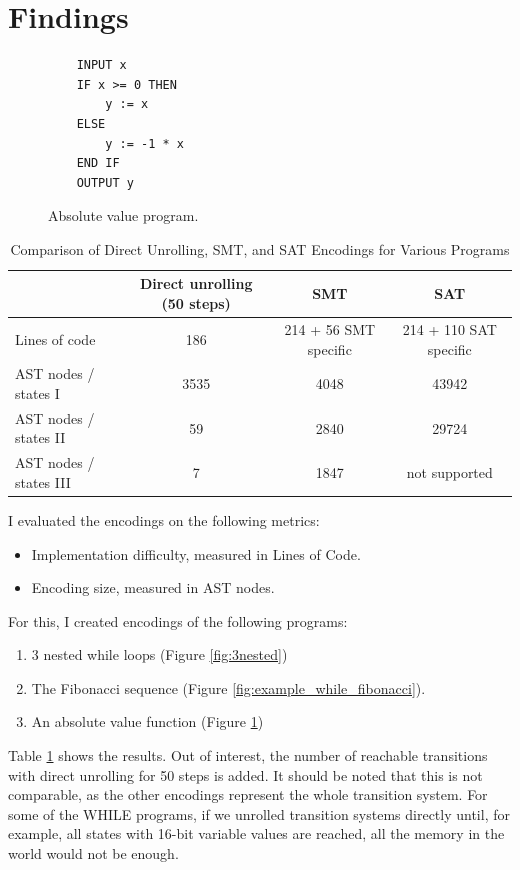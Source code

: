 \documentclass[sigconf,natbib=false]{acmart}
\begin{document}
\section{Findings}
\begin{figure}
    \centering
    \begin{verbatim}
    INPUT x
    IF x >= 0 THEN
        y := x
    ELSE
        y := -1 * x
    END IF
    OUTPUT y
    \end{verbatim}
    \caption{Absolute value program.}
    \label{fig:abs_value}
\end{figure}
\begin{table}
    \centering
    \caption{Comparison of Direct Unrolling, SMT, and SAT Encodings for Various Programs}
    \label{table}
    \begin{tabular}{|l|c|c|c|}
        \hline
        & Direct unrolling (50 steps) & SMT & SAT \\
        \hline


        Lines of code & 186 & 214 + 56 SMT specific & 214 + 110 SAT specific \\
        AST nodes / states I & 3535 & 4048 & 43942 \\
        AST nodes / states II & 59 & 2840 & 29724 \\
        AST nodes / states III & 7 & 1847 & not supported \\
        \hline
    \end{tabular}
\end{table}
I evaluated the encodings on the following metrics:
\begin{itemize}
    \item Implementation difficulty, measured in Lines of Code.
    \item Encoding size, measured in AST nodes.
\end{itemize}

For this, I created encodings of the following programs:
\begin{enumerate}[I]
    \item 3 nested while loops (Figure \ref{fig:3nested})
    \item The Fibonacci sequence (Figure \ref{fig:example_while_fibonacci}).
    \item An absolute value function (Figure \ref{fig:abs_value})
\end{enumerate}

Table \ref{table} shows the results. Out of interest, the number of reachable transitions with direct unrolling for 50 steps is added. It should be noted that this is not comparable, as the other encodings represent the whole transition system. For some of the WHILE programs, if we unrolled transition systems directly until, for example, all states with 16-bit variable values are reached, all the memory in the world would not be enough.
\end{document}
